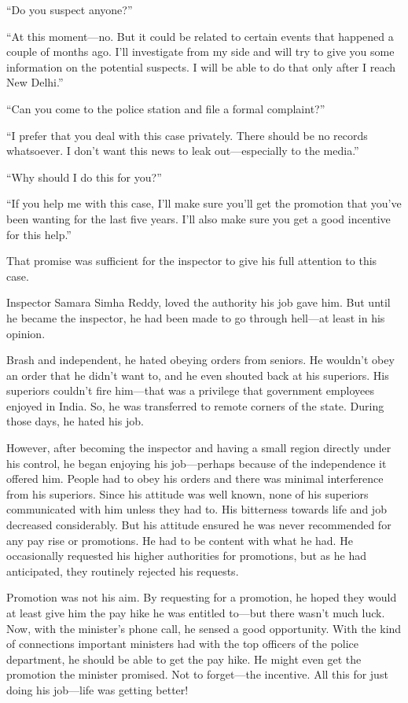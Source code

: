 “Do you suspect anyone?”

“At this moment—no. But it could be related to certain events that happened a
couple of months ago. I'll investigate from my side and will try to give you
some information on the potential suspects. I will be able to do that only after
I reach New Delhi.”

“Can you come to the police station and file a formal complaint?”

“I prefer that you deal with this case privately. There should be no records
whatsoever. I don't want this news to leak out—especially to the media.”

“Why should I do this for you?”

“If you help me with this case, I'll make sure you'll get the promotion that
you've been wanting for the last five years. I'll also make sure you
get a good incentive for this help.”

That promise was sufficient for the inspector to give his full attention to this
case.

Inspector Samara Simha Reddy, loved the authority his job gave him. But until he
became the inspector, he had been made to go through hell—at least in his opinion.

Brash and independent, he hated obeying orders from seniors. He wouldn't obey an
order that he didn't want to, and he even shouted back at his superiors.  His
superiors couldn't fire him—that was a privilege that government employees
enjoyed in India. So, he was transferred to remote corners of the state.  During
those days, he hated his job.

However, after becoming the inspector and having a small region directly under 
his control, he began enjoying his job—perhaps because of the independence it
offered him. People had to obey his orders and there was minimal interference
from his superiors. Since his attitude was well known, none of his superiors
communicated with him unless they had to. His bitterness towards life and job
decreased considerably. But his attitude ensured he was never recommended for
any pay rise or promotions. He had to be content with what he had. He
occasionally requested his higher authorities for promotions, but as he had
anticipated, they routinely rejected his requests.

Promotion was not his aim. By requesting for a promotion, he hoped they would at
least give him the pay hike he was entitled to—but there wasn't much luck.
Now, with the minister's phone call, he sensed a good opportunity. With the kind
of connections important ministers had with the top officers of the police
department, he should be able to get the pay hike. He might even get the
promotion the minister promised. Not to forget—the incentive. All this for
just doing his job—life was getting better!